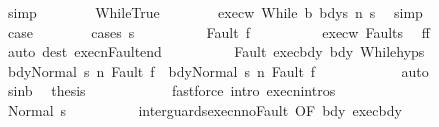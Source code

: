\begin{isabellebody}
\ simp\isanewline
\ \ \ \ \ \ \isamarkupfalse%
\ WhileTrue\isanewline
\ \ \ \ \ \ \isamarkupfalse%
\ exec{\isacharunderscore}w{\isacharcolon}\ {\isachardoublequoteopen}{\isasymGamma}{\isasymturnstile}{\isasymlangle}While\ b\ bdy{\isacharcomma}s{\isacharprime}{\isasymrangle}\ {\isacharequal}n{\isasymRightarrow}\ s{\isacharprime}{\isacharprime}{\isachardoublequoteclose}\ \isamarkupfalse%
\ simp\isanewline
\ \ \ \ \ \ \isamarkupfalse%
\ {\isacharquery}case\isanewline
\ \ \ \ \ \ \isamarkupfalse%
\ {\isacharparenleft}cases\ s{\isacharprime}{\isacharparenright}\isanewline
\ \ \ \ \ \ \ \ \isamarkupfalse%
\ {\isacharparenleft}Fault\ f{\isacharprime}{\isacharparenright}\isanewline
\ \ \ \ \ \ \ \ \isamarkupfalse%
\ exec{\isacharunderscore}w\ Fault{\isacharunderscore}s{\isacharprime}{\isacharprime}\ \isamarkupfalse%
\ {\isachardoublequoteopen}f{\isacharprime}{\isacharequal}f{\isachardoublequoteclose}\isanewline
\ \ \ \ \ \ \ \ \ \ \isamarkupfalse%
\ {\isacharparenleft}auto\ dest{\isacharcolon}\ execn{\isacharunderscore}Fault{\isacharunderscore}end{\isacharparenright}\isanewline
\ \ \ \ \ \ \ \ \isamarkupfalse%
\ Fault\ exec{\isacharunderscore}bdy\ bdy\ While{\isachardot}hyps\isanewline
\ \ \ \ \ \ \ \ \isamarkupfalse%
\ {\isachardoublequoteopen}{\isasymGamma}{\isasymturnstile}{\isasymlangle}bdy{}{\isacharcomma}Normal\ s{\isasymrangle}\ {\isacharequal}n{\isasymRightarrow}\ Fault\ f\ {\isasymor}\ {\isasymGamma}{\isasymturnstile}{\isasymlangle}bdy{}{\isacharcomma}Normal\ s{\isasymrangle}\ {\isacharequal}n{\isasymRightarrow}\ Fault\ f{\isachardoublequoteclose}\isanewline
\ \ \ \ \ \ \ \ \ \ \isamarkupfalse%
\ auto\isanewline
\ \ \ \ \ \ \ \ \isamarkupfalse%
\ s{\isacharunderscore}in{\isacharunderscore}b\ \isamarkupfalse%
\ {\isacharquery}thesis\isanewline
\ \ \ \ \ \ \ \ \ \ \isamarkupfalse%
\ {\isacharparenleft}fastforce\ intro{\isacharcolon}\ execn{\isachardot}intros{\isacharparenright}\isanewline
\ \ \ \ \ \ \isamarkupfalse%
\isanewline
\ \ \ \ \ \ \ \ \isamarkupfalse%
\ {\isacharparenleft}Normal\ s{\isacharprime}{\isacharprime}{\isacharprime}{\isacharparenright}\isanewline
\ \ \ \ \ \ \ \ \isamarkupfalse%
\ inter{\isacharunderscore}guards{\isacharunderscore}execn{\isacharunderscore}noFault\ {\isacharbrackleft}OF\ bdy\ exec{\isacharunderscore}bdy{\isacharbrackright}\isanewline

\end{isabellebody}

